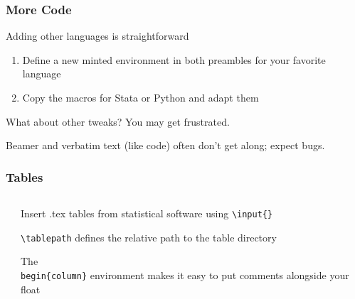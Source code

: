 \documentclass[aspectratio=169,handout]{beamer}
\begin{document}
\begin{frame}
	\frametitle{More Code}
	\begin{witem}
		\item Adding other languages is straightforward
			\begin{enumerate}
				\item Define a new minted environment
					in both preambles for your favorite language
				\item Copy the macros for Stata or Python and adapt them
			\end{enumerate}
		\item What about other tweaks? You may get frustrated.
		\item Beamer and verbatim text (like code) often don't get along; expect bugs.
	\end{witem}
\end{frame}







\begin{frame}
	\frametitle{Tables}
	\begin{columns}[T] %
	\begin{column}{.48\textwidth}
		
	\end{column}%
	\hfill%
	\begin{column}{.48\textwidth}
		\begin{witem}
		\item Insert .tex tables from statistical software
			using \texttt{\textbackslash{}input\{\}}
		\item \texttt{\textbackslash{}tablepath} defines the relative path to
			the table directory
		\item The \texttt{\\begin\{column\}} environment
			makes it easy to put comments alongside your float
	\end{witem}
	\end{column}%
	\end{columns}
\end{frame}
\end{document}
